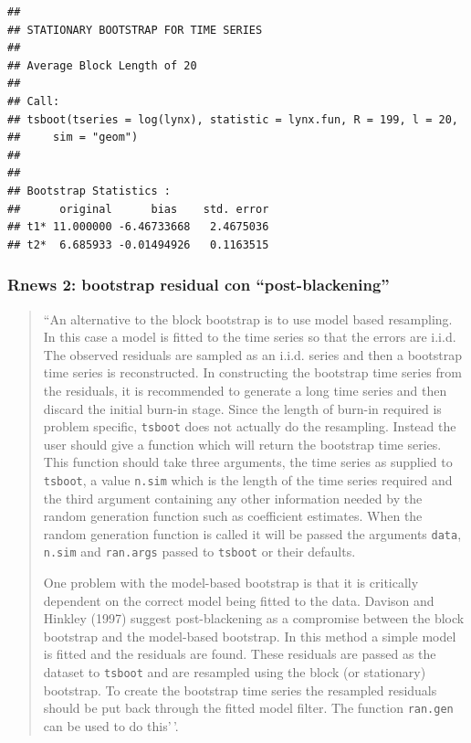 \documentclass[
]{book}
\theoremstyle{break}
\theoremstyle{nonumberplain}
\begin{document}
\begin{verbatim}
## 
## STATIONARY BOOTSTRAP FOR TIME SERIES
## 
## Average Block Length of 20 
## 
## Call:
## tsboot(tseries = log(lynx), statistic = lynx.fun, R = 199, l = 20, 
##     sim = "geom")
## 
## 
## Bootstrap Statistics :
##      original      bias    std. error
## t1* 11.000000 -6.46733668   2.4675036
## t2*  6.685933 -0.01494926   0.1163515
\end{verbatim}

\subsubsection{Rnews 2: bootstrap residual con ``post-blackening''}\label{rnews-2-bootstrap-residual-con-post-blackening}

\begin{quote}
``An alternative to the block bootstrap is to use
model based resampling. In this case a model is fitted
to the time series so that the errors are i.i.d. The
observed residuals are sampled as an i.i.d. series and
then a bootstrap time series is reconstructed. In constructing
the bootstrap time series from the residuals,
it is recommended to generate a long time series
and then discard the initial burn-in stage. Since
the length of burn-in required is problem specific,
\texttt{tsboot} does not actually do the resampling. Instead
the user should give a function which will return the
bootstrap time series. This function should take three
arguments, the time series as supplied to \texttt{tsboot}, a
value \texttt{n.sim} which is the length of the time series required
and the third argument containing any other
information needed by the random generation function
such as coefficient estimates. When the random
generation function is called it will be passed the arguments
\texttt{data}, \texttt{n.sim} and \texttt{ran.args} passed to \texttt{tsboot}
or their defaults.

One problem with the model-based bootstrap is
that it is critically dependent on the correct model
being fitted to the data. Davison and Hinkley (1997)
suggest post-blackening as a compromise between the
block bootstrap and the model-based bootstrap. In
this method a simple model is fitted and the residuals
are found. These residuals are passed as the dataset
to \texttt{tsboot} and are resampled using the block (or stationary)
bootstrap. To create the bootstrap time series
the resampled residuals should be put back through
the fitted model filter. The function \texttt{ran.gen} can be
used to do this'\,'.
\end{quote}
\end{document}
